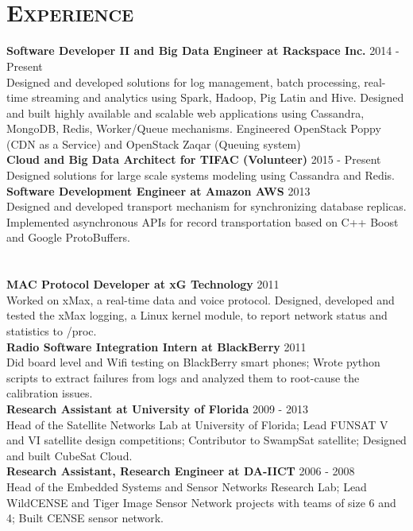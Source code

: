 \begin{resume}
\begin{formatb}
  \\
  \body\\
\end{formatb}

\section{\textsc{Experience}}
\textbf{Software Developer II and Big Data Engineer at Rackspace Inc.} \hfill 2014 - Present\\
Designed and developed solutions for log management, batch processing, real-time streaming and analytics using Spark, Hadoop, Pig Latin and Hive. Designed and built highly available and scalable web applications using Cassandra, MongoDB, Redis, Worker/Queue mechanisms. Engineered OpenStack Poppy (CDN as a Service) and OpenStack Zaqar (Queuing system)\\
\textbf{Cloud and Big Data Architect for TIFAC (Volunteer)} \hfill 2015 - Present\\
Designed solutions for large scale systems modeling using Cassandra and Redis.\\
\textbf{Software Development Engineer at Amazon AWS} \hfill 2013 \\
Designed and developed transport mechanism for synchronizing database replicas. Implemented asynchronous APIs for record transportation based on C++ Boost and Google ProtoBuffers.\\ \\ \\ 
\textbf{MAC Protocol Developer at xG Technology} \hfill 2011 \\
Worked on xMax, a real-time data and voice protocol. Designed, developed and tested the xMax logging, a Linux kernel module, to report network status and statistics to /proc.\\
\textbf{Radio Software Integration Intern at BlackBerry} \hfill 2011 \\
Did board level and Wifi testing on BlackBerry smart phones; Wrote python scripts to extract failures from logs and analyzed them to root-cause the calibration issues.\\
\textbf{Research Assistant at University of Florida} \hfill 2009 - 2013\\
Head of the Satellite Networks Lab at University of Florida; Lead FUNSAT V and VI satellite design competitions; Contributor to SwampSat satellite; Designed and built CubeSat Cloud.\\
\textbf{Research Assistant, Research Engineer at DA-IICT} \hfill 2006 - 2008 \\
Head of the Embedded Systems and Sensor Networks Research Lab; Lead WildCENSE and Tiger Image Sensor Network projects with teams of size 6 and 4; Built CENSE sensor network.


\end{resume}

